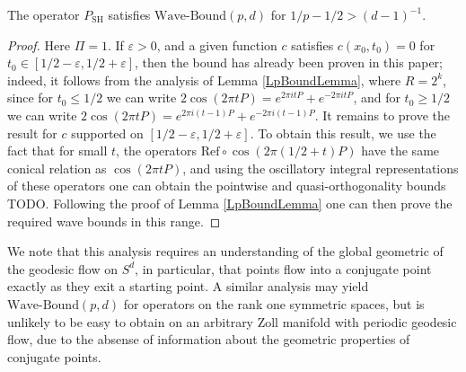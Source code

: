 \begin{lemma}
    The operator $P_{\text{SH}}$ satisfies $\text{Wave-Bound}(p,d)$ for $1/p - 1/2 > (d-1)^{-1}$.
\end{lemma}
\begin{proof}
    Here $\Pi = 1$. If $\varepsilon > 0$, and a given function $c$ satisfies $c(x_0,t_0) = 0$ for $t_0 \in [1/2 - \varepsilon, 1/2 + \varepsilon]$, then the bound has already been proven in this paper; indeed, it follows from the analysis of Lemma \ref{LpBoundLemma}, where $R = 2^k$, since for $t_0 \leq 1/2$ we can write $2 \cos(2 \pi t P) = e^{2 \pi i t P} + e^{-2 \pi i t P}$, and for $t_0 \geq 1/2$ we can write $2 \cos(2 \pi t P) = e^{2 \pi i (t - 1) P} + e^{-2 \pi i (t - 1) P}$. It remains to prove the result for $c$ supported on $[1/2 - \varepsilon, 1/2 + \varepsilon]$. To obtain this result, we use the fact that for small $t$, the operators $\text{Ref} \circ \cos(2 \pi (1/2 + t) P)$ have the same conical relation as $\cos(2 \pi t P)$, and using the oscillatory integral representations of these operators one can obtain the pointwise and quasi-orthogonality bounds TODO. Following the proof of Lemma \ref{LpBoundLemma} one can then prove the required wave bounds in this range.
\end{proof}

\begin{remark}
    We note that this analysis requires an understanding of the global geometric of the geodesic flow on $S^d$, in particular, that points flow into a conjugate point exactly as they exit a starting point. A similar analysis may yield $\text{Wave-Bound}(p,d)$ for operators on the rank one symmetric spaces, but is unlikely to be easy to obtain on an arbitrary Zoll manifold with periodic geodesic flow, due to the absense of information about the geometric properties of conjugate points.
\end{remark}